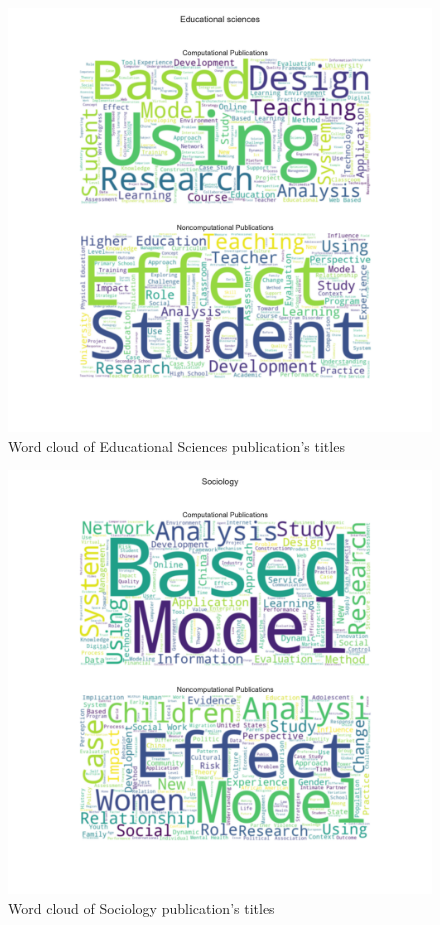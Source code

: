 \documentclass[12pt, a4paper]{article}
\begin{document}
\begin{figure}[ht]
	\centering
	\includegraphics[width=\textwidth]{wc_Educational_Sciences}
	\caption{Word cloud of Educational Sciences publication's titles}
\end{figure}
\begin{figure}[ht]
	\centering
	\includegraphics[width=\textwidth]{wc_Sociology}
	\caption{Word cloud of Sociology publication's titles}
\end{figure}
\end{document}
